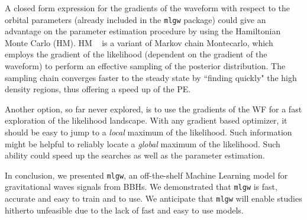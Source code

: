 A closed form expression for the gradients of the waveform with respect to the orbital parameters
(already included in the \texttt{mlgw} package)
could give an advantage on the parameter estimation procedure by using the Hamiltonian Monte Carlo (HM).
HM \cite{betancourt2017hamiltonianMC}~\cite{Porter2014Hamiltonian_MonteCarlo} is a variant of Markov chain 
Montecarlo, which employs the gradient of the likelihood (dependent on the gradient of the waveform) 
to perform an effective sampling of the posterior distribution. The sampling chain converges faster to 
the steady state by ``finding quickly" the high density regions, thus offering a speed up of the PE.

Another option, so far never explored, is to use the gradients of the WF for a fast exploration of the likelihood landscape. 
With any gradient based optimizer, it should be easy to jump to a \textit{local} maximum of the likelihood. 
Such information might be helpful to reliably locate a \textit{global} maximum of the likelihood.
Such ability could speed up the searches as well as the parameter estimation.

In conclusion, we presented \texttt{mlgw}, an off-the-shelf Machine Learning model for gravitational waves signals from BBHs. 
We demonstrated that \texttt{mlgw} is fast, accurate and easy to train and to use. We anticipate 
that \texttt{mlgw} will enable studies hitherto unfeasible due to the lack of fast and easy to use models.






